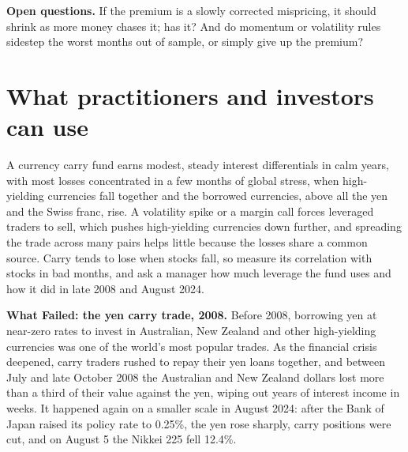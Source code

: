 \label{sec:06-open}
\textbf{Open questions.} If the premium is a slowly corrected mispricing, it should shrink as more money chases it; has it? And do momentum or volatility rules sidestep the worst months out of sample, or simply give up the premium?

\section{What practitioners and investors can use}
\label{sec:06-investors}

A currency carry fund earns modest, steady interest differentials in calm years, with most losses concentrated in a few months of global stress, when high-yielding currencies fall together and the borrowed currencies, above all the yen and the Swiss franc, rise. A volatility spike or a margin call forces leveraged traders to sell, which pushes high-yielding currencies down further, and spreading the trade across many pairs helps little because the losses share a common source. Carry tends to lose when stocks fall, so measure its correlation with stocks in bad months, and ask a manager how much leverage the fund uses and how it did in late 2008 and August 2024.

\begin{callout}
\textbf{What Failed: the yen carry trade, 2008.} Before 2008, borrowing yen at near-zero rates to invest in Australian, New Zealand and other high-yielding currencies was one of the world's most popular trades. As the financial crisis deepened, carry traders rushed to repay their yen loans together, and between July and late October 2008 the Australian and New Zealand dollars lost more than a third of their value against the yen, wiping out years of interest income in weeks. It happened again on a smaller scale in August 2024: after the Bank of Japan raised its policy rate to 0.25\%, the yen rose sharply, carry positions were cut, and on August 5 the Nikkei 225 fell 12.4\%.
\end{callout}

\makeatletter
{}
\makeatother

